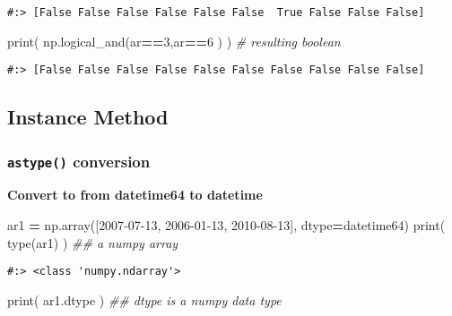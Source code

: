 \documentclass[
]{book}
\newenvironment{Shaded}{\begin{snugshade}}{\end{snugshade}}
\newcommand{\BuiltInTok}[1]{#1}
\newcommand{\CommentTok}[1]{\textcolor[rgb]{0.37,0.37,0.37}{\textit{#1}}}
\newcommand{\DecValTok}[1]{\textcolor[rgb]{0.06,0.06,0.06}{#1}}
\newcommand{\NormalTok}[1]{#1}
\newcommand{\OperatorTok}[1]{\textcolor[rgb]{0.43,0.43,0.43}{\textbf{#1}}}
\newcommand{\StringTok}[1]{\textcolor[rgb]{0.5,0.5,0.5}{#1}}
\begin{document}
\begin{verbatim}
#:> [False False False False False False  True False False False]
\end{verbatim}

\begin{Shaded}
\begin{Highlighting}[]
\BuiltInTok{print}\NormalTok{( np.logical\_and(ar}\OperatorTok{==}\DecValTok{3}\NormalTok{,ar}\OperatorTok{==}\DecValTok{6}\NormalTok{ ) )  }\CommentTok{\# resulting boolean}
\end{Highlighting}
\end{Shaded}

\begin{verbatim}
#:> [False False False False False False False False False False]
\end{verbatim}

\hypertarget{instance-method-3}{%
\subsection{Instance Method}\label{instance-method-3}}

\hypertarget{astype-conversion}{%
\subsubsection{\texorpdfstring{\texttt{astype()} conversion}{astype() conversion}}\label{astype-conversion}}

\textbf{Convert to from datetime64 to datetime}

\begin{Shaded}
\begin{Highlighting}[]
\NormalTok{ar1 }\OperatorTok{=}\NormalTok{ np.array([}\StringTok{\textquotesingle{}2007{-}07{-}13\textquotesingle{}}\NormalTok{, }\StringTok{\textquotesingle{}2006{-}01{-}13\textquotesingle{}}\NormalTok{, }\StringTok{\textquotesingle{}2010{-}08{-}13\textquotesingle{}}\NormalTok{], dtype}\OperatorTok{=}\StringTok{\textquotesingle{}datetime64\textquotesingle{}}\NormalTok{)}
\BuiltInTok{print}\NormalTok{( }\BuiltInTok{type}\NormalTok{(ar1) )  }\CommentTok{\#\# a numpy array}
\end{Highlighting}
\end{Shaded}

\begin{verbatim}
#:> <class 'numpy.ndarray'>
\end{verbatim}

\begin{Shaded}
\begin{Highlighting}[]
\BuiltInTok{print}\NormalTok{( ar1.dtype )  }\CommentTok{\#\# dtype is a numpy data type}
\end{Highlighting}
\end{Shaded}
\end{document}
